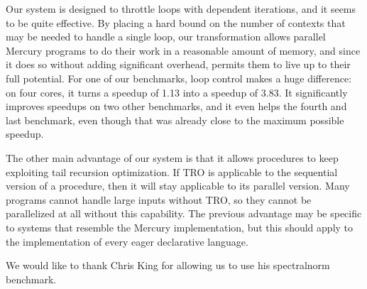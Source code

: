 Our system is designed to throttle loops with dependent iterations,
and it seems to be quite effective.
By placing a hard bound on the number of contexts
that may be needed to handle a single loop,
our transformation allows parallel Mercury programs
to do their work in a reasonable amount of memory,
and since it does so without adding significant overhead,
permits them to live up to their full potential.
For one of our benchmarks,
loop control makes a huge difference:
on four cores, it turns a speedup of 1.13 into a speedup of 3.83.
It significantly improves speedups on two other benchmarks,
and it even helps the fourth and last benchmark,
even though that was already close to the maximum possible speedup.

The other main advantage of our system
is that it allows procedures to keep exploiting tail recursion optimization.
If TRO is applicable to the sequential version of a procedure,
then it will stay applicable to its parallel version.
Many programs cannot handle large inputs without TRO,
so they cannot be parallelized at all without this capability.
The previous advantage may be specific
to systems that resemble the Mercury implementation,
but this should apply to the implementation
of every eager declarative language.


We would like to thank
Chris King for allowing us to use his spectralnorm benchmark.


